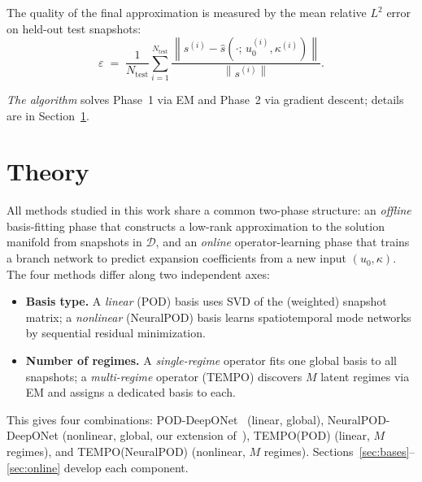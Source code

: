 \documentclass{article}
\newcommand{\norm}[1]{\left\|#1\right\|}
\begin{document}
The quality of the final approximation is measured by the mean
relative $L^2$ error on held-out test snapshots:
\begin{equation}
  \varepsilon \;=\; \frac{1}{N_\mathrm{test}}
  \sum_{i=1}^{N_\mathrm{test}}
  \frac{\norm{s^{(i)} - \hat{s}(\cdot;\,u_0^{(i)},\kappa^{(i)})}}
       {\norm{s^{(i)}}} .
  \label{eq:metric}
\end{equation}

\textit{The algorithm} solves Phase~1 via EM and 
Phase~2 via gradient descent; details are in Section~\ref{sec:theory}.
\newpage















\section{Theory}\label{sec:theory}



All methods studied in this work share a common two-phase structure:
an \emph{offline} basis-fitting phase that constructs a low-rank
approximation to the solution manifold from snapshots in $\mathcal{D}$,
and an \emph{online} operator-learning phase that trains a branch
network to predict expansion coefficients from a new input
$(u_0, \kappa)$.
The four methods differ along two independent axes:

\begin{itemize}
  \item \textbf{Basis type.}
    A \emph{linear} (POD) basis uses SVD of the (weighted) snapshot
    matrix; a \emph{nonlinear} (NeuralPOD) basis learns spatiotemporal
    mode networks by sequential residual minimization.
  \item \textbf{Number of regimes.}
    A \emph{single-regime} operator fits one global basis to all
    snapshots; a \emph{multi-regime} operator (TEMPO) discovers $M$
    latent regimes via EM and assigns a dedicated basis to each.
\end{itemize}

\noindent
This gives four combinations:
POD-DeepONet~\cite{Lu2022} (linear, global),
NeuralPOD-DeepONet (nonlinear, global, our extension of~\cite{Mou2026}),
TEMPO(POD) (linear, $M$ regimes), and
TEMPO(NeuralPOD) (nonlinear, $M$ regimes).
Sections~\ref{sec:bases}--\ref{sec:online} develop each component.
\end{document}
